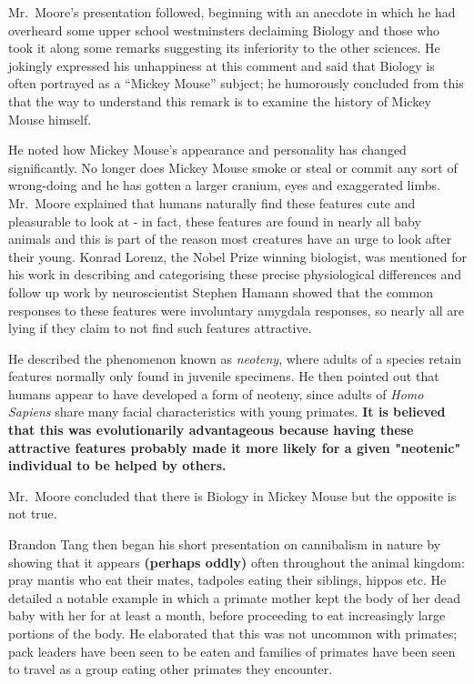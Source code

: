 \documentclass[11pt,a4paper]{report}
\newcounter{count}
\begin{document}
\begin{multicols}{2}
Mr.~Moore's presentation followed, beginning with an anecdote in which
he had overheard some upper school westminsters declaiming Biology and
those who took it along some remarks suggesting its inferiority to the
other sciences. He jokingly expressed his unhappiness at this comment
and said that Biology is often portrayed as a ``Mickey Mouse'' subject;
he humorously concluded from this that the way to understand this remark
is to examine the history of Mickey Mouse himself.

He noted how Mickey Mouse's appearance and personality has changed
significantly. No longer does Mickey Mouse smoke or steal or commit any
sort of wrong-doing and he has gotten a larger cranium, eyes and
exaggerated limbs. Mr.~Moore explained that humans naturally find these
features cute and pleasurable to look at - in fact, these features are
found in nearly all baby animals and this is part of the reason most
creatures have an urge to look after their young. Konrad Lorenz, the
Nobel Prize winning biologist, was mentioned for his work in describing
and categorising these precise physiological differences and follow up
work by neuroscientist Stephen Hamann showed that the common responses
to these features were involuntary amygdala responses, so nearly all are
lying if they claim to not find such features attractive.

He described the phenomenon known as \textit{neoteny}, where adults of a
species retain features normally only found in juvenile specimens. He
then pointed out that humans appear to have developed a form of neoteny,
since adults of \textit{Homo Sapiens} share many facial characteristics
with young primates.
\textbf{It is believed that this was evolutionarily advantageous because having these attractive features probably made it more likely for a given "neotenic" individual to be helped by others.}

Mr.~Moore concluded that there is Biology in Mickey Mouse but the
opposite is not true.

Brandon Tang then began his short presentation on cannibalism in nature
by showing that it appears \textbf{(perhaps oddly)} often throughout the
animal kingdom: pray mantis who eat their mates, tadpoles eating their
siblings, hippos etc. He detailed a notable example in which a primate
mother kept the body of her dead baby with her for at least a month,
before proceeding to eat increasingly large portions of the body. He
elaborated that this was not uncommon with primates; pack leaders have
been seen to be eaten and families of primates have been seen to travel
as a group eating other primates they encounter.


\end{multicols}
\end{document}
